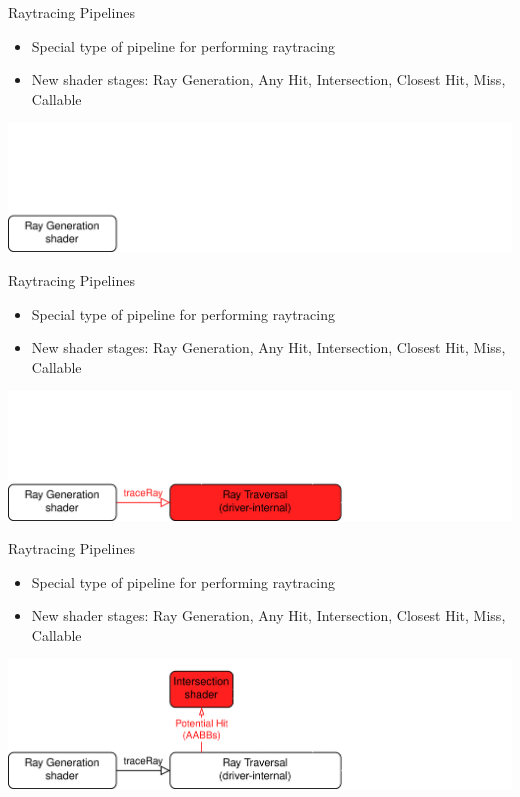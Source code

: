 \documentclass[aspectratio=169,t]{beamer}
\begin{document}
\begin{slide}{Raytracing Pipelines}
    \begin{itemize}
     \item Special type of pipeline for performing raytracing
     \item New shader stages: Ray Generation, Any Hit, Intersection, Closest Hit, Miss, Callable
    \end{itemize}
    \pause
    \includegraphics[width=0.95\linewidth]{graphics/RTStages1.png}
\end{slide}

\begin{slide}{Raytracing Pipelines}
    \begin{itemize}
     \item Special type of pipeline for performing raytracing
     \item New shader stages: Ray Generation, Any Hit, Intersection, Closest Hit, Miss, Callable
    \end{itemize}
    \includegraphics[width=0.95\linewidth]{graphics/RTStages2.png}
\end{slide}

\begin{slide}{Raytracing Pipelines}
    \begin{itemize}
     \item Special type of pipeline for performing raytracing
     \item New shader stages: Ray Generation, Any Hit, Intersection, Closest Hit, Miss, Callable
    \end{itemize}
    \includegraphics[width=0.95\linewidth]{graphics/RTStages3.png}
\end{slide}
\end{document}

